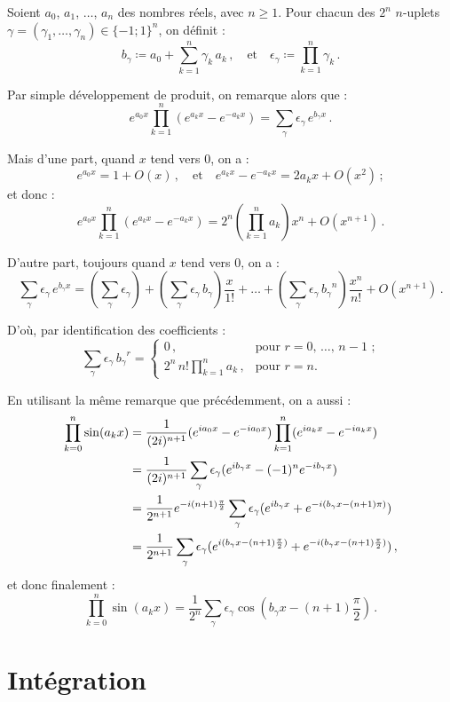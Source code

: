 \documentclass[a4paper,11pt]{article}
\newcommand{\g}{\ensuremath{\gamma}\xspace}
\newcommand{\bg}{\ensuremath{b_{\gamma}}\xspace}
\newcommand{\eg}{\ensuremath{\epsilon_{\gamma}}\xspace}
\begin{document}
Soient $a_0$, $a_1$, $\ldots$, $a_n$ des nombres réels, avec $n\ge 1$.
Pour chacun des $2^n$ $n$-uplets
$\g=(\g_1, \ldots, \g_n) \in \{-1;1\}^n$, on définit :
\[
  \bg \coloneq a_0 + \sum_{k=1}^{n} \g_k\,a_k\,,\quad\text{et}\quad
  \eg \coloneq \prod_{k=1}^{n} \g_k \,.
\]

Par simple développement de produit, on remarque alors que :
\[
  e^{a_0 x}\prod_{k=1}^n (e^{a_k x}-e^{-a_k x})
  = \sum_\g \eg\,e^{\bg x} \,.
\]

Mais d'une part, quand $x$ tend vers $0$, on a :
\[
  e^{a_0 x} = 1 + O(x) \,,\quad\text{et}\quad
  e^{a_k x}-e^{-a_k x} = 2a_k x + O(x^2) \,;
\]
et donc :
\[
  e^{a_0 x}\prod_{k=1}^n (e^{a_k x}-e^{-a_k x})
  = 2^n \left(\prod_{k=1}^{n}a_k\right)x^n + O(x^{n+1}) \,.
\]

D'autre part, toujours quand $x$ tend vers $0$, on a :
\[
  \sum_\g \eg\,e^{\bg x}=\left(\sum_\g \eg\right) +
  \left(\sum_\g \eg\,\bg\right)\frac{x}{1!} + \ldots +
  \left(\sum_\g \eg\,\bg^n\right)\frac{x^n}{n!} + O(x^{n+1}) \,.
\]

D'où, par identification des coefficients :
\begin{equation}\label{eq:sumegbg}
  \sum_\g \eg\,\bg^r =
  \begin{cases}
    0\,, & \text{pour $r=0$, $\ldots$, $n-1$ ;} \\
    2^n\,n! \displaystyle\prod_{k=1}^{n}a_k\,, & \text{pour $r=n$.}
  \end{cases}
\end{equation}

En utilisant la même remarque que précédemment, on a aussi :
\begin{align*}
  \prod_{k=0}^n \sin(a_k x) &= \frac{1}{(2i)^{n+1}}
    (e^{ia_0 x}-e^{-ia_0 x})\prod_{k=1}^n (e^{ia_k x}-e^{-ia_k x}) \\
  &= \frac{1}{(2i)^{n+1}} \sum_\g \eg(e^{i\bg x}-(-1)^n e^{-i\bg x}) \\
  &= \frac{1}{2^{n+1}} e^{-i(n+1)\frac{\pi}{2}}
     \sum_\g \eg(e^{i\bg x}+e^{-i(\bg x-(n+1)\pi)}) \\
  &= \frac{1}{2^{n+1}} \sum_\g \eg(e^{i(\bg x-(n+1)\frac{\pi}{2})} +
     e^{-i(\bg x-(n+1){\pi\over2})}) \,,
\end{align*}
et donc finalement :
\begin{equation}\label{eq:prodsin}
  \prod_{k=0}^n \sin(a_k x) =
  \frac{1}{2^n}\sum_\g \eg\cos\left(\bg x-(n+1)\frac{\pi}{2}\right)\,.
\end{equation}

\section{Intégration}
\end{document}
